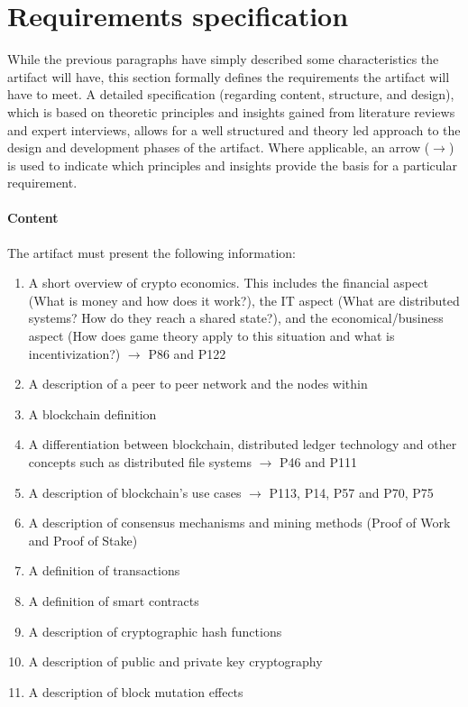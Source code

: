 \section{Requirements specification} \label{sec:ReqSpec}
While the previous paragraphs have simply described some characteristics the artifact will have, this section formally defines the requirements the artifact will have to meet. A detailed specification (regarding content, structure, and design), which is based on theoretic principles and insights gained from literature reviews and expert interviews, allows for a well structured and theory led approach to the design and development phases of the artifact. Where applicable, an arrow ($\rightarrow$) is used to indicate which principles and insights provide the basis for a particular requirement.

\paragraph{Content} The artifact must present the following information: 
\begin{enumerate}
    \item A short overview of crypto economics. This includes the financial aspect (What is money and how does it work?), the IT aspect (What are distributed systems? How do they reach a shared state?), and the economical/business aspect (How does game theory apply to this situation and what is incentivization?) $\rightarrow$ \cite{RalphBeckmann_Interview} P86 and P122
    \item A description of a peer to peer network and the nodes within
    \item A blockchain definition 
    \item A differentiation between blockchain, distributed ledger technology and other concepts such as distributed file systems $\rightarrow$ \cite{DanielKaltenbach_Interview} P46 and \cite{RalphBeckmann_Interview} P111
    \item A description of blockchain's use cases $\rightarrow$ \cite{RalphBeckmann_Interview} P113, \cite{DanielKaltenbach_Interview} P14, P57 and \cite{BjoernPaulewicz_Interview} P70, P75
    \item A description of consensus mechanisms and mining methods (Proof of Work and Proof of Stake)
    \item A definition of transactions
    \item A definition of smart contracts
    \item A description of cryptographic hash functions
    \item A description of public and private key cryptography
    \item A description of block mutation effects
\setcounter{foo}{\value{enumi}}
\end{enumerate}

